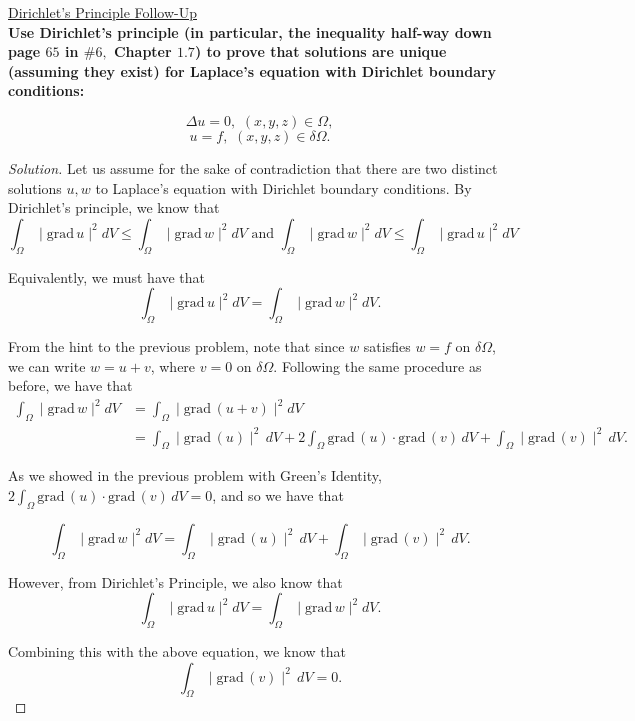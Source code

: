 \documentclass[11pt]{article}
\newenvironment{solution}
  {\renewcommand\qedsymbol{$\blacksquare$}\begin{proof}[Solution]}
  {\end{proof}}
\begin{document}
\newpage

\underline{Dirichlet's Principle Follow-Up} \\

\textbf{Use Dirichlet's principle (in particular, the inequality half-way down page $65$ in $\# 6,$ Chapter $1.7$) to prove that solutions are unique (assuming they exist) for Laplace's equation with Dirichlet boundary conditions:}

\[ \Delta u = 0, \, \, (x, y, z) \in \Omega, \] \[ u = f, \, \, (x, y, z) \in \delta \Omega.\]

\begin{solution}
Let us assume for the sake of contradiction that there are two distinct solutions $u, w$ to Laplace's equation with Dirichlet boundary conditions. By Dirichlet's principle, we know that
\[ \int_{\Omega} \mid \mathrm{grad} \, u \mid^2 dV \leq \int_{\Omega} \mid \mathrm{grad} \, w \mid^2 dV \text { and } \int_{\Omega} \mid \mathrm{grad} \, w \mid^2 dV \leq \int_{\Omega} \mid \mathrm{grad} \, u \mid^2 dV\]

Equivalently, we must have that
\[ \int_{\Omega} \mid \mathrm{grad} \, u \mid^2 dV = \int_{\Omega} \mid \mathrm{grad} \, w \mid^2 dV. \]

From the hint to the previous problem, note that since $w$ satisfies $w = f$ on $\delta \Omega$, we can write $w = u + v$, where $v = 0$ on $\delta \Omega.$ Following the same procedure as before, we have that
\begin{align*}
    \int_{\Omega} \mid  \mathrm{grad} \, w \mid^2 dV &= \int_\Omega \mid \mathrm{grad} \, (u + v) \mid ^2 dV \\
    &= \int_{\Omega} \mid \mathrm{grad} \, (u) \mid^2 \, dV + 2\int_{\Omega} \mathrm{grad} \, (u) \cdot \mathrm{grad} \, (v) \, dV + \int_{\Omega} \mid \mathrm{grad} \, (v) \mid^2 \, dV.
\end{align*}

As we showed in the previous problem with Green's Identity, $2\int_{\Omega} \mathrm{grad} \, (u) \cdot \mathrm{grad} \, (v) \, dV = 0$, and so we have that 

\[ \int_{\Omega} \mid  \mathrm{grad} \, w \mid^2 dV  = \int_{\Omega} \mid \mathrm{grad} \, (u) \mid^2 \, dV + \int_{\Omega} \mid \mathrm{grad} \, (v) \mid^2 \, dV.\]

However, from Dirichlet's Principle, we also know that \[ \int_{\Omega} \mid \mathrm{grad} \, u \mid^2 dV = \int_{\Omega} \mid \mathrm{grad} \, w \mid^2 dV. \]

Combining this with the above equation, we know that \[\int_{\Omega} \mid \mathrm{grad} \, (v) \mid^2 \, dV = 0.\] 


\end{solution}
\end{document}
